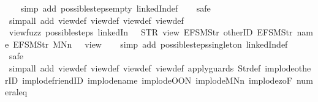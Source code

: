 \begin{isabellebody}
%
\isadelimproof
\ \ %
\endisadelimproof
%
\isatagproof
{}\isamarkupfalse%
\ {\isacharparenleft}simp\ add{\isacharcolon}\ possible{\isacharunderscore}steps{\isacharunderscore}empty\ linkedIn{\isacharunderscore}def{\isacharparenright}\isanewline
\ \ \isamarkupfalse%
\ safe\isanewline
\ \ \isamarkupfalse%
\ {\isacharparenleft}simp{\isacharunderscore}all\ add{\isacharcolon}\ view{\isacharunderscore}def\ view{}{\isacharunderscore}def\ view{}{\isacharunderscore}def\ view{}{\isacharunderscore}def{\isacharparenright}%
\endisatagproof
{\isafoldproof}%
%
\isadelimproof
\isanewline
%
\endisadelimproof
\isanewline
{}\isamarkupfalse%
\ view{\isacharunderscore}fuzz{\isacharcolon}\ {\isachardoublequoteopen}possible{\isacharunderscore}steps\ linkedIn\ {}\ {\isacharless}{\isachargreater}\ STR\ {\isacharprime}{\isacharprime}view{\isacharprime}{\isacharprime}\ {\isacharbrackleft}EFSM{\isachardot}Str\ {\isacharprime}{\isacharprime}otherID{\isacharprime}{\isacharprime}{\isacharcomma}\ EFSM{\isachardot}Str\ {\isacharprime}{\isacharprime}name{\isacharprime}{\isacharprime}{\isacharcomma}\ EFSM{\isachardot}Str\ {\isacharprime}{\isacharprime}MNn{}{\isacharprime}{\isacharprime}{\isacharbrackright}\ {\isacharequal}\ {\isacharbraceleft}{\isacharbar}{\isacharparenleft}{}{\isacharcomma}\ view{}{\isacharparenright}{\isacharbar}{\isacharbraceright}{\isachardoublequoteclose}\isanewline
%
\isadelimproof
\ \ %
\endisadelimproof
%
\isatagproof
{}\isamarkupfalse%
\ {\isacharparenleft}simp\ add{\isacharcolon}\ possible{\isacharunderscore}steps{\isacharunderscore}singleton\ linkedIn{\isacharunderscore}def{\isacharparenright}\isanewline
\ \ \isamarkupfalse%
\ safe\isanewline
\ \ \isamarkupfalse%
\ {\isacharparenleft}simp{\isacharunderscore}all\ add{\isacharcolon}\ view{\isacharunderscore}def\ view{}{\isacharunderscore}def\ view{}{\isacharunderscore}def\ view{}{\isacharunderscore}def\ apply{\isacharunderscore}guards\ Str{\isacharunderscore}def\ implode{\isacharunderscore}otherID\ implode{\isacharunderscore}friendID\ implode{\isacharunderscore}name\ implode{\isacharunderscore}OON\ implode{\isacharunderscore}MNn{}\ implode{\isacharunderscore}{}zoF\ numeral{\isacharunderscore}{}{\isacharunderscore}eq{\isacharunderscore}{}{\isacharparenright}%
\endisatagproof
{\isafoldproof}%
%
\isadelimproof
\isanewline
%
\endisadelimproof

\end{isabellebody}
